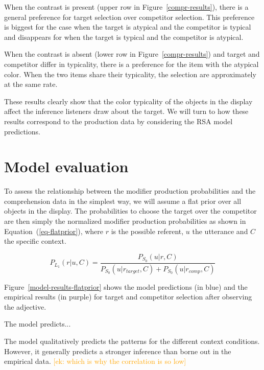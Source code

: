 \documentclass[10pt,letterpaper]{article}
\newcommand{\ek}[1]{\textcolor{Orange}{[ek: #1]}}
\begin{document}
When the contrast is present (upper row in Figure~\ref{compr-results}), there is a general preference for target selection over competitor selection. This preference is biggest for the case when the target is atypical and the competitor is typical and disappears for when the target is typical and the competitor is atypical. 

When the contrast is absent (lower row in Figure~\ref{compr-results}) and target and competitor differ in typicality, there is a preference for the item with the atypical color. When the two items share their typicality, the selection are approximately at the same rate. 

These results clearly show that the color typicality of the objects in the display affect the inference listeners draw about the target. We will turn to how these results correspond to the production data by considering the RSA model predictions.

\section{Model evaluation}

To assess the relationship between the modifier production probabilities and the comprehension data in the simplest way, we will assume a flat prior over all objects in the display. The probabilities to choose the target over the competitor are then simply the normalized modifier production probabilities as shown in Equation~(\ref{eq-flatprior}), where $r$ is the possible referent, $u$ the utterance and $C$ the specific context.

\begin{equation}
	P_{L_1}(r|u,C) = \frac{P_{S_0}(u|r,C)}{P_{S_0}(u|r_{target},C) + P_{S_0}(u|r_{comp},C)}
\label{eq-flatprior}
\end{equation}

Figure~\ref{model-results-flatprior} shows the model predictions (in blue) and the empirical results (in purple) for target and competitor selection after observing the adjective. 

The model predicts...

The model qualitatively predicts the patterns for the different context conditions. However, it generally predicts a stronger inference than borne out in the empirical data. \ek{which is why the correlation is so low}
\end{document}
